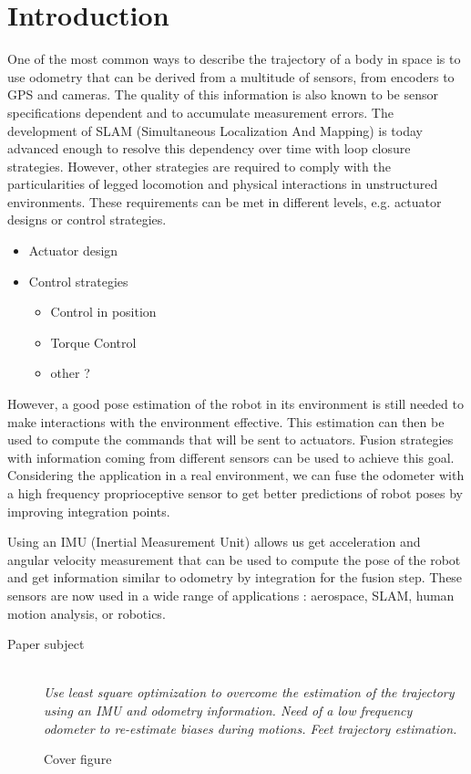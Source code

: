 
\section{Introduction}\label{sec:intro}

One of the most common ways to describe the trajectory of a body in space is to use odometry that can be derived from a multitude of sensors, from encoders to GPS and cameras.
The quality of this information is also known to be sensor specifications dependent and to accumulate measurement errors. The development of SLAM (Simultaneous Localization And Mapping) is today advanced enough to resolve 
this dependency over time with loop closure strategies. However, other strategies are required to comply with the particularities of legged locomotion and physical interactions in unstructured environments. These requirements can be met in 
different levels, e.g. actuator designs or control strategies.

  \begin{itemize}
   \item Actuator design  \cite{wensing2017proprioceptive}
   \item Control strategies
    \begin{itemize}
     \item Control in position
     \item Torque Control
     \item other ?
    \end{itemize}
  \end{itemize}

However, a good pose estimation of the robot in its environment is still needed to make interactions with the environment effective. This estimation can then be used to compute the commands that will be sent to actuators.
Fusion strategies with information coming from different sensors can be used to achieve this goal. Considering the application in a real environment, we can fuse the odometer with a high frequency proprioceptive sensor 
to get better predictions of robot poses by improving integration points.

Using an IMU (Inertial Measurement Unit) allows us get acceleration and angular velocity measurement that can be used to compute the pose of the robot and get information similar to odometry by integration for the fusion step.
These sensors are now used in a wide range of applications : aerospace, SLAM, human motion analysis, or robotics.


\begin{description}
 \item [Paper subject] \hfill \\ \textit{Use least square optimization to overcome the estimation of the trajectory using an IMU and odometry information. Need of a low frequency odometer to re-estimate biases during motions. Feet trajectory estimation.}
\end{description}


\begin{figure}
\centering
	\caption{Cover figure}
	\label{fig:cover}
\end{figure}

